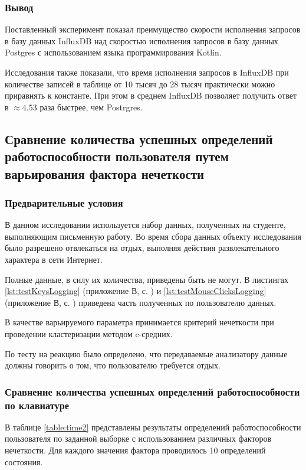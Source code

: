 \subsubsection*{Вывод}

Поставленный эксперимент показал преимущество скорости исполнения запросов в базу данных InfluxDB над скоростью исполнения запросов в базу данных Postgres с использованием языка программирования Kotlin.

Исследования также показали, что время исполнения запросов в InfluxDB при количестве записей в таблице от 10 тысяч до 28 тысяч практически можно приравнять к константе. При этом в среднем InfluxDB позволяет получить ответ в $\approx 4.53$ раза быстрее, чем Postrgres.

\subsection{Сравнение количества успешных определений работоспособности пользователя путем варьирования фактора нечеткости}

\subsubsection{Предварительные условия}

В данном исследовании используется набор данных, полученных на студенте, выполняющим письменную работу. Во время сбора данных объекту исследования было разрешено отвлекаться на отдых, выполняя действия развлекательного характера в сети Интернет.

Полные данные, в силу их количества, приведены быть не могут. В листингах \ref{lst:testKeysLogging} (приложение В, с. \pageref{chp:application-c}) и \ref{lst:testMouseClicksLogging} (приложение В, с. \pageref{chp:application-c}) приведена часть полученных по пользователю данных.

В качестве варьируемого параметра принимается критерий нечеткости при проведении кластеризации методом c-средних.

По тесту на реакцию было определено, что передаваемые анализатору данные должны говорить о том, что пользователю требуется отдых.

\subsubsection{Сравнение количества успешных определений работоспособности по клавиатуре}

В таблице \ref{table:time2} представлены результаты определений работоспособности пользователя по заданной выборке с использованием различных факторов нечеткости. Для каждого значения фактора проводилось 10 определений состояния.

